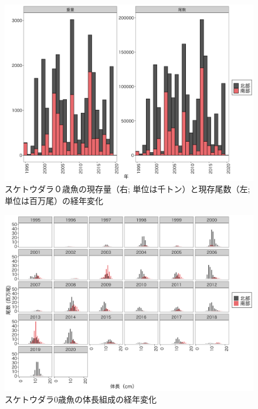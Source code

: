 \documentclass[11pt]{article} %
\begin{document}
\begin{linenumbers}
\begin{figure}[h]
  \centering
  \includegraphics[width = 14cm]{スケトウダラ０＋trend.png}
  \caption{スケトウダラ０歳魚の現存量（右; 単位は千トン）と現存尾数（左; 単位は百万尾）の経年変化}
\end{figure}

\begin{figure}[h]
  \centering
  \includegraphics[width = 14cm]{スケトウダラ0+length.png}
  \caption{スケトウダラ0歳魚の体長組成の経年変化}
\end{figure}


\end{linenumbers}
\end{document}
